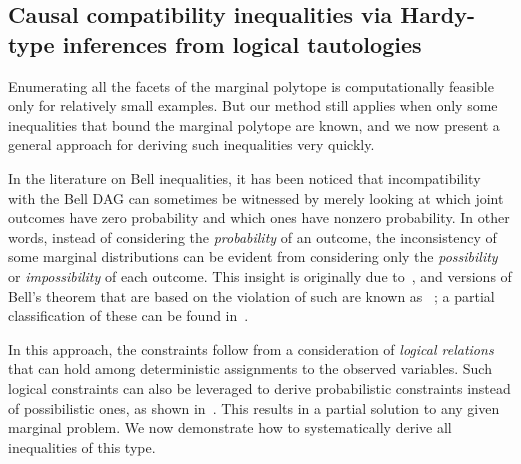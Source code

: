 {%
\subsection{Causal compatibility inequalities via Hardy-type inferences from logical tautologies}\label{sec:TSEM}


Enumerating all the facets of the marginal polytope is computationally feasible only for relatively small examples. But our method still applies when only some inequalities that bound the marginal polytope are known, and we now present a general approach for deriving such inequalities very quickly.

In the literature on Bell inequalities, it has been noticed that incompatibility with the Bell DAG can sometimes be witnessed by merely looking at which joint outcomes have zero probability and which ones have nonzero probability. In other words, instead of considering the \emph{probability} of an outcome, the inconsistency of some marginal distributions can be evident from considering only the \emph{possibility} or \emph{impossibility} of each outcome. This insight is originally due to~\citet{L.Hardy:PRL:1665}, and versions of Bell's theorem that are based on the violation of such  are known as ~\cite{Garuccio95,CabelloHardyInequality,Braun08,Mancinska14,LSW}; a partial classification of these can be found in~\cite{Mansfield2012}.

In this approach, the constraints follow from a consideration of {\em logical relations} that can hold among deterministic assignments to the observed variables. Such logical constraints can also be leveraged to derive probabilistic constraints instead of possibilistic ones, as shown in~\cite{Pitowsky1989,Ghirardi08}. This results in a partial solution to any given marginal problem. We now demonstrate how to systematically derive all inequalities of this type.

}
